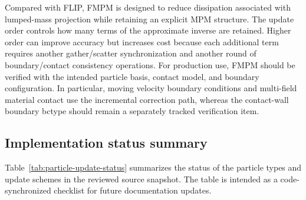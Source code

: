 Compared with FLIP, FMPM is designed to reduce dissipation associated with lumped-mass projection while retaining an explicit MPM structure.  The update order controls how many terms of the approximate inverse are retained.  Higher order can improve accuracy but increases cost because each additional term requires another gather/scatter synchronization and another round of boundary/contact consistency operations.  For production use, FMPM should be verified with the intended particle basis, contact model, and boundary configuration.  In particular, moving velocity boundary conditions and multi-field material contact use the incremental correction path, whereas the contact-wall boundary bctype should remain a separately tracked verification item.

\subsection{Implementation status summary}
\label{subsec:particle-update-status}

Table~\ref{tab:particle-update-status} summarizes the status of the particle types and update schemes in the reviewed source snapshot.  The table is intended as a code-synchronized checklist for future documentation updates.

